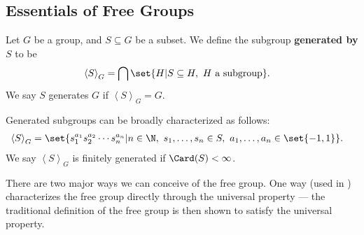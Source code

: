 \subsection{Essentials of Free Groups}%
\begin{definition}
  Let $G$ be a group, and $S\subseteq G$ be a subset. We define the subgroup \textbf{generated by} $S$ to be
  \begin{align*}
    \left\langle S \right\rangle_{G} &= \bigcap \set{H | S\subseteq H,~H\text{ a subgroup}}.
  \end{align*}
  We say $S$ generates $G$ if $\left\langle S \right\rangle_{G} = G$.\newline

  Generated subgroups can be broadly characterized as follows:
  \begin{align*}
    \left\langle S \right\rangle_{G} &= \set{s_1^{a_1}s_2^{a_2}\cdots s_n^{a_n} | n\in\N,~s_1,\dots,s_n\in S,~a_1,\dots,a_n\in \set{-1,1}}.
  \end{align*}
  We say $\left\langle S \right\rangle_{G}$ is finitely generated if $\Card(S) < \infty$.
\end{definition}
There are two major ways we can conceive of the free group. One way (used in \cite{loh_geometric_group_theory}) characterizes the free group directly through the universal property --- the traditional definition of the free group is then shown to satisfy the universal property.\newline

